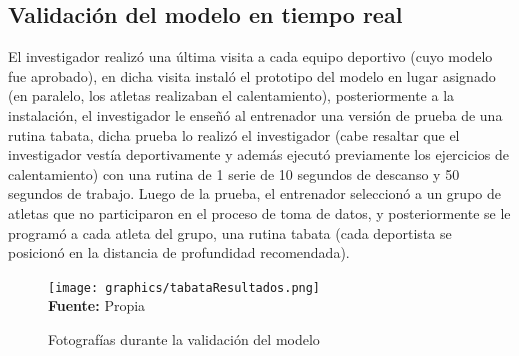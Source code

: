 \subsection{Validaci\'on  del modelo en tiempo real}
El investigador realiz\'o una \'ultima visita a cada equipo deportivo (cuyo modelo fue aprobado), en dicha visita instal\'o el prototipo del modelo en lugar asignado (en paralelo, los atletas realizaban el calentamiento), posteriormente a la instalaci\'on, el investigador le ense\~n\'o al entrenador una versi\'on de prueba de una rutina tabata, dicha prueba lo realiz\'o el investigador (cabe resaltar que el investigador vest\'ia deportivamente y adem\'as ejecut\'o previamente los ejercicios de calentamiento) con una rutina de 1 serie de 10 segundos de descanso y 50 segundos de trabajo. Luego de la prueba, el entrenador seleccion\'o a un grupo de atletas que no participaron en el proceso de toma de datos, y posteriormente se le program\'o a cada atleta del grupo, una rutina tabata (cada deportista se posicion\'o en la distancia de profundidad recomendada).
 \begin{figure}[H]
	\caption{Fotograf\'ias durante la validaci\'on del modelo}
	\label{fig:getvalidationStep}
	\centering
	\texttt{[image: graphics/tabataResultados.png]} \\
	\textbf{Fuente:} Propia
\end{figure} 